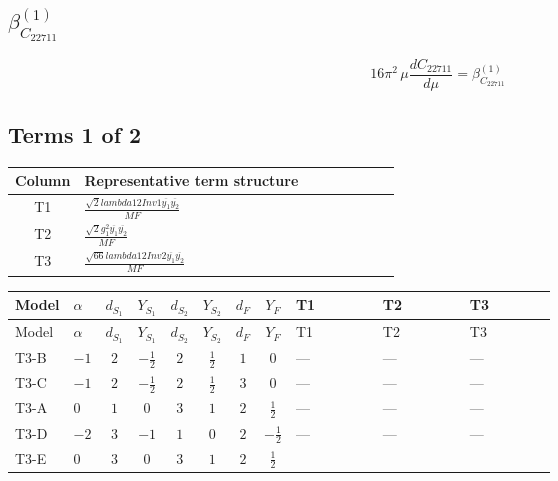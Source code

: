 \documentclass[8pt]{article}
\begin{document}
\begin{landscape}
\section*{$\beta_{C_{22711}}^{(1)}$}
\[16\pi^2\,\mu\frac{d C_{22711}}{d\mu}=\beta_{C_{22711}}^{(1)}\]
\subsection*{Terms 1 of 2}
\begin{center}
\begin{tabular}{@{}c >{\raggedright\arraybackslash}p{0.82\linewidth}@{}}
\toprule
Column & Representative term structure \\
\midrule
T1 & \(\displaystyle \frac{\sqrt{2} lambda12Inv1 \overline{y_{1}} \overline{y_{2}}}{MF}\) \\
\midrule
T2 & \(\displaystyle \frac{\sqrt{2} g_{1}^{2} \overline{y_{1}} \overline{y_{2}}}{MF}\) \\
\midrule
T3 & \(\displaystyle \frac{\sqrt{66} lambda12Inv2 \overline{y_{1}} \overline{y_{2}}}{MF}\) \\
\midrule
\bottomrule
\end{tabular}
\end{center}
\smallskip
\tiny
\begin{longtable}{@{}llcccccc >{\raggedright\arraybackslash}p{0.21\linewidth} >{\raggedright\arraybackslash}p{0.21\linewidth} >{\raggedright\arraybackslash}p{0.21\linewidth}@{}}
\toprule
Model & $\alpha$ & $d_{S_1}$ & $Y_{S_1}$ & $d_{S_2}$ & $Y_{S_2}$ & $d_F$ & $Y_F$ & T1 & T2 & T3 \\
\midrule
\endfirsthead
\toprule
Model & $\alpha$ & $d_{S_1}$ & $Y_{S_1}$ & $d_{S_2}$ & $Y_{S_2}$ & $d_F$ & $Y_F$ & T1 & T2 & T3 \\
\midrule
\endhead
T3-B & $-1$ & $2$ & $-\frac{1}{2}$ & $2$ & $\frac{1}{2}$ & $1$ & $0$ & --- & --- & --- \\
\midrule
T3-C & $-1$ & $2$ & $-\frac{1}{2}$ & $2$ & $\frac{1}{2}$ & $3$ & $0$ & --- & --- & --- \\
\midrule
T3-A & $0$ & $1$ & $0$ & $3$ & $1$ & $2$ & $\frac{1}{2}$ & --- & --- & --- \\
\midrule
T3-D & $-2$ & $3$ & $-1$ & $1$ & $0$ & $2$ & $-\frac{1}{2}$ & --- & --- & --- \\
\midrule
T3-E & $0$ & $3$ & $0$ & $3$ & $1$ & $2$ & $\frac{1}{2}$ & \scriptsize\adjustbox{max width=\linewidth}{$\begin{gathered} - \frac{\sqrt{2} lambda12Inv1 \overline{y_{1}} \overline{y_{2}}}{4 MF}\end{gathered}$} & \scriptsize\adjustbox{max width=\linewidth}{$\begin{gathered} \frac{3 \sqrt{2} g_{1}^{2} \overline{y_{1}} \overline{y_{2}}}{16 MF}\end{gathered}$} & \scriptsize\adjustbox{max width=\linewidth}{$\begin{gathered} \frac{3 \sqrt{66} lambda12Inv2 \overline{y_{1}} \overline{y_{2}}}{44 MF}\end{gathered}$} \\
\midrule
\bottomrule
\end{longtable}
\clearpage

\end{landscape}
\end{document}
